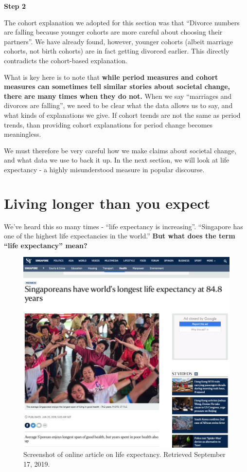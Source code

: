 \documentclass[openany]{book}
\begin{document}
\textbf{Step 2}

The cohort explanation we adopted for this section was that ``Divorce
numbers are falling because younger cohorts are more careful about
choosing their partners''. We have already found, however, younger
cohorts (albeit marriage cohorts, not birth cohorts) are in fact getting
divorced earlier. This directly contradicts the cohort-based
explanation.

What is key here is to note that \textbf{while period measures and
cohort measures can sometimes tell similar stories about societal
change, there are many times when they do not.} When we say ``marriages
and divorces are falling'', we need to be clear what the data allows us
to say, and what kinds of explanations we give. If cohort trends are not
the same as period trends, than providing cohort explanations for period
change becomes meaningless.

We must therefore be very careful how we make claims about societal
change, and what data we use to back it up. In the next section, we will
look at life expectancy - a highly misunderstood measure in popular
discourse.

\section{Living longer than you
expect}\label{living-longer-than-you-expect}

We've heard this so many times - ``life expectancy is increasing''.
``Singapore has one of the highest life expectancies in the world.''
\textbf{But what does the term ``life expectancy'' mean?}

\begin{figure}

{\centering \includegraphics[width=0.8\linewidth]{images/apc/apc_lifeexpectancy} 

}

\caption{Screenshot of online article on life expectancy. Retrieved September 17, 2019.}\label{fig:apc-lifeexp}
\end{figure}
\end{document}
